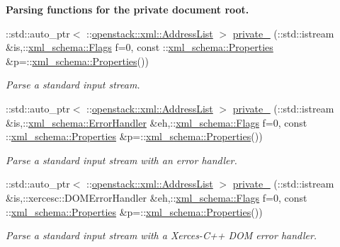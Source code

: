 \begin{Indent}{\bf Parsing functions for the private document root.}
\begin{DoxyCompactItemize}
::std::auto\_\-ptr$<$ ::\hyperlink{classopenstack_1_1xml_1_1AddressList}{openstack::xml::AddressList} $>$ \hyperlink{namespaceopenstack_1_1xml_aad784c462cfee28f5422a90626964764}{private\_\-} (::std::istream \&is,::\hyperlink{namespacexml__schema_affb4c227cbd9aa7453dd1dc5a1401943}{xml\_\-schema::Flags} f=0, const ::\hyperlink{namespacexml__schema_ad27ce19a7ee1d3b1064092648898f64c}{xml\_\-schema::Properties} \&p=::\hyperlink{namespacexml__schema_ad27ce19a7ee1d3b1064092648898f64c}{xml\_\-schema::Properties}())
\begin{DoxyCompactList}\small\item\em Parse a standard input stream. \item\end{DoxyCompactList}\item 
::std::auto\_\-ptr$<$ ::\hyperlink{classopenstack_1_1xml_1_1AddressList}{openstack::xml::AddressList} $>$ \hyperlink{namespaceopenstack_1_1xml_a8af8116113142dae2584f86a2ab8f5dc}{private\_\-} (::std::istream \&is,::\hyperlink{namespacexml__schema_ab1c9361bfd3b404eaabf0c31eded79dc}{xml\_\-schema::ErrorHandler} \&eh,::\hyperlink{namespacexml__schema_affb4c227cbd9aa7453dd1dc5a1401943}{xml\_\-schema::Flags} f=0, const ::\hyperlink{namespacexml__schema_ad27ce19a7ee1d3b1064092648898f64c}{xml\_\-schema::Properties} \&p=::\hyperlink{namespacexml__schema_ad27ce19a7ee1d3b1064092648898f64c}{xml\_\-schema::Properties}())
\begin{DoxyCompactList}\small\item\em Parse a standard input stream with an error handler. \item\end{DoxyCompactList}\item 
::std::auto\_\-ptr$<$ ::\hyperlink{classopenstack_1_1xml_1_1AddressList}{openstack::xml::AddressList} $>$ \hyperlink{namespaceopenstack_1_1xml_a7c0c663fbc898bd87fa9cd826310ea8e}{private\_\-} (::std::istream \&is,::xercesc::DOMErrorHandler \&eh,::\hyperlink{namespacexml__schema_affb4c227cbd9aa7453dd1dc5a1401943}{xml\_\-schema::Flags} f=0, const ::\hyperlink{namespacexml__schema_ad27ce19a7ee1d3b1064092648898f64c}{xml\_\-schema::Properties} \&p=::\hyperlink{namespacexml__schema_ad27ce19a7ee1d3b1064092648898f64c}{xml\_\-schema::Properties}())
\begin{DoxyCompactList}\small\item\em Parse a standard input stream with a Xerces-\/C++ DOM error handler. \item\end{DoxyCompactList}\item 

\end{DoxyCompactItemize}
\end{Indent}
